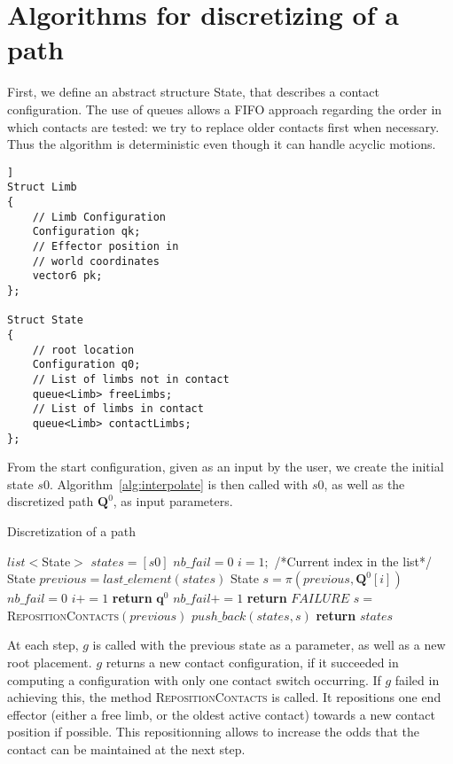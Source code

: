 \section{Algorithms for discretizing of a path}
\label{app:contact}


First, we define an abstract structure State,
that describes a contact configuration.
The use of queues allows a FIFO approach regarding the order 
in which contacts are tested: we try to replace older contacts first when necessary.
Thus the algorithm is deterministic even though it can handle acyclic motions.

\begin{lstlisting}]
Struct Limb
{
    // Limb Configuration
    Configuration qk;
    // Effector position in
    // world coordinates
    vector6 pk;
};

Struct State
{
    // root location
    Configuration q0;
    // List of limbs not in contact
    queue<Limb> freeLimbs;
    // List of limbs in contact
    queue<Limb> contactLimbs;
};
\end{lstlisting}

From the start configuration, given as an input by the user,
we create the initial state $s0$.
Algorithm~\ref{alg:interpolate}  is then called with $s0$, as well as the discretized path 
$\mathbf{Q}^0$, as input parameters.

\begin{algorithm}
\caption{Discretization of a path} \label{interpolate}
	\begin{algorithmic}[1]
		\State $list<$State$>$ $states = [s0]$
		\State $nb\_fail = 0$ 
		\State $i = 1;$ /*Current index in the list*/
			\State State $previous = last\_element(states)$
			\State State $s = \pi(previous, \mathbf{Q}^0[i])$
				\State $nb\_fail = 0$
				\State $i += 1$
				\State \textbf{return} $\mathbf{q}^{0}$
			\Else
				\State $nb\_fail += 1$
					\State \textbf{return} $FAILURE$
				\EndIf				
				\State $s = $\textsc{RepositionContacts}$(previous)$
			\EndIf
			\State $push\_back(states, s)$
		\EndWhile
		\State \textbf{return} $states$
	\EndFunction
\end{algorithmic}
\label{alg:interpolate}
\end{algorithm}

At each step, $g$ is called with the previous state as a parameter, as well
as a new root placement. $g$ returns a new contact configuration, if it succeeded
in computing a configuration with only one contact switch occurring.
If $g$ failed in achieving this, the method \textsc{RepositionContacts} is called.
It repositions one end effector (either a free limb, or the oldest active contact) towards a new contact position if possible.
This repositionning allows to increase the odds that the contact can be maintained at the next step.

